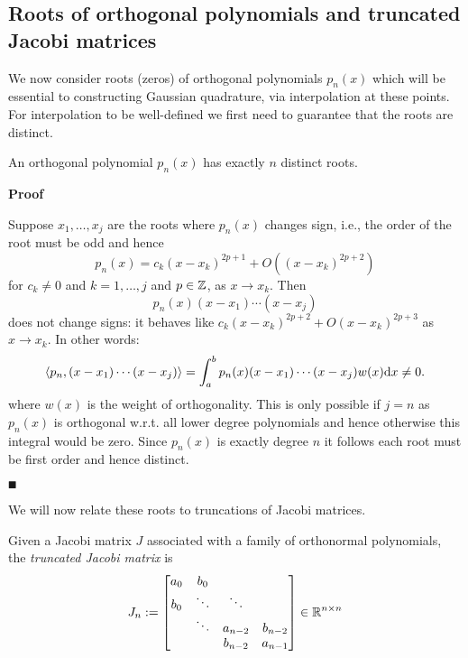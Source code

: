 \subsection{Roots of orthogonal polynomials and truncated Jacobi matrices}
We now consider roots (zeros) of orthogonal polynomials $p_n(x)$ which will be essential to constructing Gaussian quadrature, via interpolation at these points. For interpolation to be well-defined we first need to guarantee that the roots are distinct.

\begin{lemma}[OP roots] An orthogonal polynomial $p_n(x)$ has exactly $n$ distinct roots.

\end{lemma}
\textbf{Proof}

Suppose $x_1, \ensuremath{\ldots},x_j$ are the roots where $p_n(x)$ changes sign, i.e., the order of the root must be odd and hence
\[
p_n(x) = c_k (x-x_k)^{2p+1} + O((x-x_k)^{2p+2})
\]
for $c_k \ensuremath{\neq} 0$ and $k = 1,\ensuremath{\ldots},j$ and $p \in {\mathbb Z}$, as $x \ensuremath{\rightarrow} x_k$. Then
\[
p_n(x) (x-x_1) \ensuremath{\cdots}(x-x_j)
\]
does not change signs: it behaves like $c_k (x-x_k)^{2p+2} + O(x-x_k)^{2p+3}$ as $x \ensuremath{\rightarrow} x_k$. In other words:
\[
\ensuremath{\langle}p_n,(x-x_1) \ensuremath{\cdots}(x-x_j) \ensuremath{\rangle} = \int_a^b p_n(x) (x-x_1) \ensuremath{\cdots}(x-x_j) w(x) {\rm d} x \ensuremath{\neq} 0.
\]
where $w(x)$ is the weight of orthogonality. This is only possible if $j = n$ as $p_n(x)$ is orthogonal w.r.t. all lower degree polynomials and hence otherwise this integral would be zero. Since $p_n(x)$ is exactly degree $n$ it follows each root must be first order and hence distinct.

\ensuremath{\QED}

We will now relate these roots to truncations of Jacobi matrices.

\begin{definition} Given a Jacobi matrix $J$ associated with a family of orthonormal polynomials,  the \emph{truncated Jacobi matrix} is
\[
J_n := \begin{bmatrix} a_0 & b_0 \\
                         b_0 & \ddots & \ddots \\
                         & \ddots & a_{n-2} & b_{n-2} \\
                         && b_{n-2} & a_{n-1} \end{bmatrix} \in {\mathbb R}^{n \times n}
\]
\end{definition}

